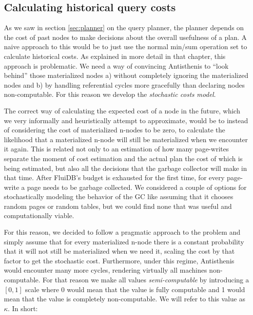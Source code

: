 \subsection{Calculating historical query costs}
\label{sec:historical_cost}

As we saw in section \ref{sec:planner} on the query planner, the
planner depends on the cost of past nodes to make decisions about the
overall usefulness of a plan. A naive approach to this would be to
just use the normal min/sum operation set to calculate historical
costs. As explained in more detail in that chapter, this approach is
problematic. We need a way of convincing Antisthenis to ``look
behind'' those materialized nodes a) without completely ignoring the
materialized nodes and b) by handling referential cycles more
gracefully than declaring nodes non-computable. For this reason we
develop the \emph{stochastic costs model}.

The correct way of calculating the expected cost of a node in the
future, which we very informally and heuristically attempt to
approximate, would be to instead of considering the cost of
materialized n-nodes to be zero, to calculate the likelihood that a
materialized n-node will still be materialized when we encounter it
again. This is related not only to an estimation of how many
page-writes separate the moment of cost estimation and the actual plan
the cost of which is being estimated, but also all the decisions that
the garbage collector will make in that time. After FluiDB's budget is
exhausted for the first time, for every page-write a page needs
to be garbage collected. We considered a couple of options for
stochastically modeling the behavior of the GC like assuming that it
chooses random pages or random tables, but we could find none that was
useful and computationally viable.

For this reason, we decided to follow a pragmatic approach to the
problem and simply assume that for every materialized n-node there is
a constant probability that it will not still be materialized when we
need it, scaling the cost by that factor to get the stochastic
cost. Furthermore, under this regime, Antisthenis would encounter many
more cycles, rendering virtually all machines non-computable. For that
reason we make all values \emph{semi-computable} by introducing a
\([0,1]\) scale where 0 would mean that the value is fully computable
and 1 would mean that the value is completely non-computable. We will
refer to this value as \(\kappa\). In short:

